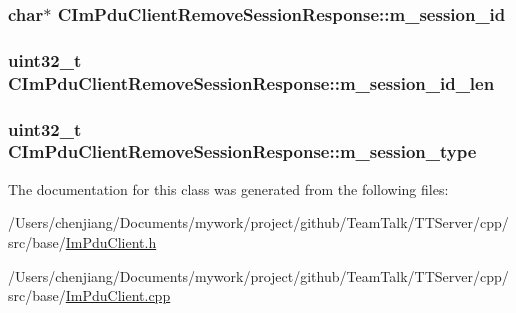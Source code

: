 \subsubsection[{m\+\_\+session\+\_\+id}]{\setlength{\rightskip}{0pt plus 5cm}char$\ast$ C\+Im\+Pdu\+Client\+Remove\+Session\+Response\+::m\+\_\+session\+\_\+id\hspace{0.3cm}{\ttfamily [private]}}\label{class_c_im_pdu_client_remove_session_response_a1eb582fb07dae370ccc380917236ce7b}
\hypertarget{class_c_im_pdu_client_remove_session_response_a0e6d5b013741cd4a463c976c2ebf5dea}{}
\subsubsection[{m\+\_\+session\+\_\+id\+\_\+len}]{\setlength{\rightskip}{0pt plus 5cm}uint32\+\_\+t C\+Im\+Pdu\+Client\+Remove\+Session\+Response\+::m\+\_\+session\+\_\+id\+\_\+len\hspace{0.3cm}{\ttfamily [private]}}\label{class_c_im_pdu_client_remove_session_response_a0e6d5b013741cd4a463c976c2ebf5dea}
\hypertarget{class_c_im_pdu_client_remove_session_response_a2157287da34e01b9ac5e27ec9f42fbcf}{}
\subsubsection[{m\+\_\+session\+\_\+type}]{\setlength{\rightskip}{0pt plus 5cm}uint32\+\_\+t C\+Im\+Pdu\+Client\+Remove\+Session\+Response\+::m\+\_\+session\+\_\+type\hspace{0.3cm}{\ttfamily [private]}}\label{class_c_im_pdu_client_remove_session_response_a2157287da34e01b9ac5e27ec9f42fbcf}


The documentation for this class was generated from the following files\+:\begin{DoxyCompactItemize}
\item 
/\+Users/chenjiang/\+Documents/mywork/project/github/\+Team\+Talk/\+T\+T\+Server/cpp/src/base/\hyperlink{_im_pdu_client_8h}{Im\+Pdu\+Client.\+h}\item 
/\+Users/chenjiang/\+Documents/mywork/project/github/\+Team\+Talk/\+T\+T\+Server/cpp/src/base/\hyperlink{_im_pdu_client_8cpp}{Im\+Pdu\+Client.\+cpp}\end{DoxyCompactItemize}
